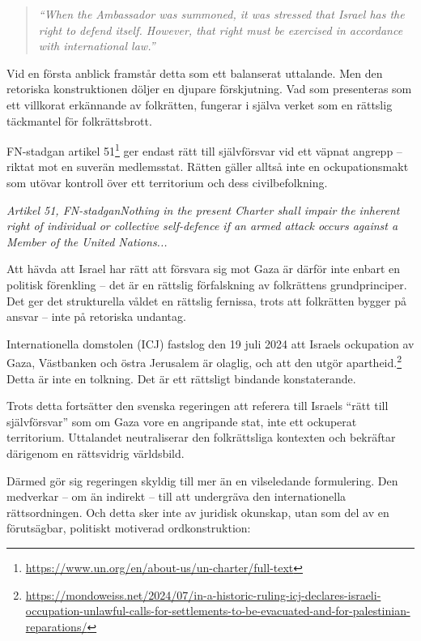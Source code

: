 \documentclass[12pt]{article}
\newcommand{\lagrum}[1]{\par\vspace{3mm}\textit{#1}\par\vspace{5mm}}
\begin{document}
\begin{quote}
\textit{“When the Ambassador was summoned, it was stressed that Israel has the right to defend itself. However, that right must be exercised in accordance with international law.”}
\end{quote}

Vid en första anblick framstår detta som ett balanserat uttalande. Men den retoriska konstruktionen döljer en djupare förskjutning. Vad som presenteras som ett villkorat erkännande av folkrätten, fungerar i själva verket som en rättslig täckmantel för folkrättsbrott.

FN-stadgan artikel 51\footnote{\url{https://www.un.org/en/about-us/un-charter/full-text}} ger endast rätt till självförsvar vid ett väpnat angrepp – riktat mot en suverän medlemsstat. Rätten gäller alltså inte en ockupationsmakt som utövar kontroll över ett territorium och dess civilbefolkning.

\lagrum{Artikel 51, FN-stadgan\quad Nothing in the present Charter shall impair the inherent right of individual or collective self-defence if an armed attack occurs against a Member of the United Nations...}

Att hävda att Israel har rätt att försvara sig mot Gaza är därför inte enbart en politisk förenkling – det är en rättslig förfalskning av folkrättens grundprinciper. Det ger det strukturella våldet en rättslig fernissa, trots att folkrätten bygger på ansvar – inte på retoriska undantag.

Internationella domstolen (ICJ) fastslog den 19 juli 2024 att Israels ockupation av Gaza, Västbanken och östra Jerusalem är olaglig, och att den utgör apartheid.\footnote{\url{https://mondoweiss.net/2024/07/in-a-historic-ruling-icj-declares-israeli-occupation-unlawful-calls-for-settlements-to-be-evacuated-and-for-palestinian-reparations/}} Detta är inte en tolkning. Det är ett rättsligt bindande konstaterande.

Trots detta fortsätter den svenska regeringen att referera till Israels \enquote{rätt till självförsvar} som om Gaza vore en angripande stat, inte ett ockuperat territorium. Uttalandet neutraliserar den folkrättsliga kontexten och bekräftar därigenom en rättsvidrig världsbild.

Därmed gör sig regeringen skyldig till mer än en vilseledande formulering. Den medverkar – om än indirekt – till att undergräva den internationella rättsordningen. Och detta sker inte av juridisk okunskap, utan som del av en förutsägbar, politiskt motiverad ordkonstruktion:
\end{document}
